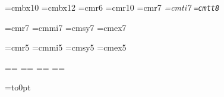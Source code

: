 \def\columnbox{\leftline{\pagebody}}

\def\bye{\par\vfill
  \supereject
  \if R\lcr \null\vfill\eject \fi
  \end}


\font\bbf=cmbx10
\font\vbbf=cmbx12
\font\smrm=cmr6
\font\brm=cmr10
\font\rm=cmr7
\font\it=cmti7
\font\tt=cmtt8

\font\tenrm=cmr7 %
\font\teni=cmmi7 %
\font\tensy=cmsy7 %
\font\tenex=cmex7 %

\font\sevenrm=cmr5 %
\font\seveni=cmmi5 %
\font\sevensy=cmsy5 %
\font\sevenex=cmex5 %

=\tenrm {}=\sevenrm%
{}=\teni {}=\seveni%
{}=\tensy {}=\sevensy%
{}=\tenex {}=\tenex%


\hfuzz=1pt
\vfuzz=1pt
\raggedright
\raggedbottom
\normalbaselineskip=9pt
\baselineskip=9pt

\parindent=0pt
\parskip=0pt
\footline={\vbox to0pt{\hss}}

\def\ctl#1{{\tt C-#1}}
\def\opt#1{{\brm[{\rm #1}]}}
\def\xtra#1{\noalign{\smallskip{\tt#1}}}


\long{}

\long{}


\long{}

